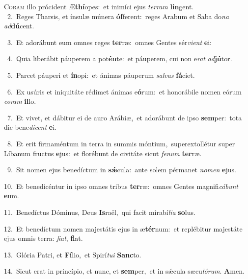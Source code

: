 \lettrine{\initial\textcolor{\initialcolor}{C}}{oram} illo prócident Æ\-\textbf{thí}\-opes:~\star et inimíci ejus \textit{ter}\-\textit{ram} \textbf{lin}\-gent.\\
{\numbfont\textcolor{\numbcolor}{~2.}}~Reges Tharsis, et ínsulæ múnera \textbf{óf}\-ferent:~\star reges Arabum et Saba do\textit{na} \textit{ad}\-\textbf{dú}cent.\par
{\numbfont\textcolor{\numbcolor}{~3.}}~Et adorábunt eum omnes reges \textbf{ter}\-ræ:~\star omnes Gentes sér\-\textit{vi}\-\textit{ent} \textbf{e}\-i:\par
{\numbfont\textcolor{\numbcolor}{~4.}}~Quia liberábit páuperem a pot\-\textbf{én}\-te:~\star et páuperem, cui non e\textit{rat} \textit{ad}\-\textbf{jú}tor.\par
{\numbfont\textcolor{\numbcolor}{~5.}}~Parcet páuperi et \textbf{ín}\-opi:~\star et ánimas páuperum \textit{sal}\-\textit{vas} \textbf{fá}\-ciet.\par
{\numbfont\textcolor{\numbcolor}{~6.}}~Ex usúris et iniquitáte rédimet ánimas e\-\textbf{ó}\-rum:~\star et honorábile nomen eórum \textit{co}\-\textit{ram} \textbf{il}\-lo.\par
{\numbfont\textcolor{\numbcolor}{~7.}}~Et vivet, et dábitur ei de auro Arábiæ,~\dagger et adorábunt de ipso \textbf{sem}\-per:~\star tota die bene\-\textit{dí}\-\textit{cent} \textbf{e}\-i.\par
{\numbfont\textcolor{\numbcolor}{~8.}}~Et erit firmaméntum in terra in summis móntium,~\dagger superextollétur super Líbanum fructus \textbf{e}\-jus:~\star et florébunt de civitáte sicut \textit{fe}\-\textit{num} \textbf{ter}\-ræ.\par
{\numbfont\textcolor{\numbcolor}{~9.}}~Sit nomen ejus benedíctum in \textbf{sǽ}\-cula:~\star ante solem pérmanet \textit{no}\-\textit{men} \textbf{e}\-jus.\par
{\numbfont\textcolor{\numbcolor}{10.}}~Et benedicéntur in ipso omnes tribus \textbf{ter}\-ræ:~\star omnes Gentes magnifi\-\textit{cá}\-\textit{bunt} \textbf{e}\-um.\par
{\numbfont\textcolor{\numbcolor}{11.}}~Benedíctus Dóminus, Deus \textbf{Is}\-raël,~\star qui facit mirabí\-\textit{li}\-\textit{a} \textbf{so}\-lus.\par
{\numbfont\textcolor{\numbcolor}{12.}}~Et benedíctum nomen majestátis ejus in æ\-\textbf{tér}\-num:~\star et replébitur majestáte ejus omnis terra: \textit{fi}\-\textit{at}, \textbf{fi}\-at.\par
{\numbfont\textcolor{\numbcolor}{13.}}~Glória Patri, et \textbf{Fí}\-lio,~\star et Spirí\-\textit{tu}\-\textit{i} \textbf{Sanc}\-to.\par
{\numbfont\textcolor{\numbcolor}{14.}}~Sicut erat in princípio, et nunc, et \textbf{sem}\-per,~\star et in sǽcula sæcu\-\textit{ló}\-\textit{rum}. \textbf{A}\-men.\par
